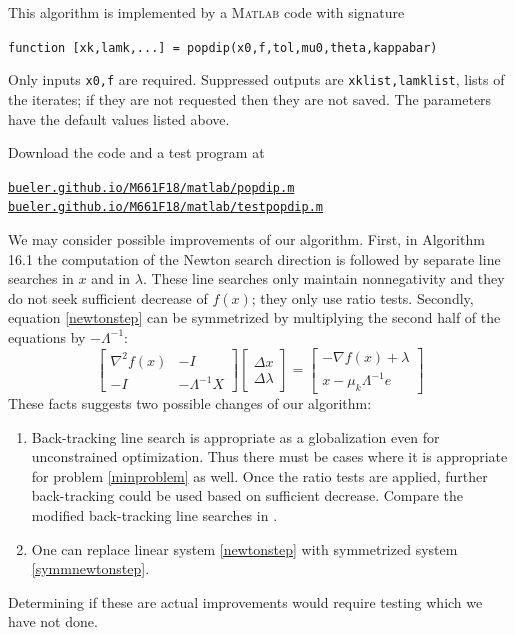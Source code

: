 \documentclass[11pt]{article}
\newcommand{\grad}{\nabla}
\newcommand{\Matlab}{\textsc{Matlab}\xspace}
\begin{document}
This algorithm is implemented by a \Matlab code with signature
\begin{center}
\texttt{function [xk,lamk,...] = popdip(x0,f,tol,mu0,theta,kappabar)}
\end{center}
Only inputs \texttt{x0,f} are required.  Suppressed outputs are \texttt{xklist,lamklist}, lists of the iterates; if they are not requested then they are not saved.  The parameters have the default values listed above.

Download the code and a test program at
\begin{center}
    \href{http://bueler.github.io/M661F18/matlab/popdip.m}{\texttt{bueler.github.io/M661F18/matlab/popdip.m}}
    \href{http://bueler.github.io/M661F18/matlab/testpopdip.m}{\texttt{bueler.github.io/M661F18/matlab/testpopdip.m}}
\end{center}

We may consider possible improvements of our algorithm.  First, in Algorithm 16.1 the computation of the Newton search direction is followed by separate line searches in $x$ and in $\lambda$.  These line searches only maintain nonnegativity and they do not seek sufficient decrease of $f(x)$; they only use ratio tests.  Secondly, equation \eqref{newtonstep} can be symmetrized by multiplying the second half of the equations by $-\Lambda^{-1}$:
\begin{equation}
\begin{bmatrix}
\grad^2 f(x) & - I \\
-I & - \Lambda^{-1} X
\end{bmatrix}
\begin{bmatrix}
\Delta x \\
\Delta \lambda
\end{bmatrix}
=
\begin{bmatrix}
-\grad f(x) + \lambda \\
x - \mu_k \Lambda^{-1} e
\end{bmatrix}
 \label{symmnewtonstep}
\end{equation}
These facts suggests two possible changes of our algorithm:
\begin{enumerate}
\item Back-tracking line search is appropriate as a globalization even for unconstrained optimization.  Thus there must be cases where it is appropriate for problem \eqref{minproblem} as well.  Once the ratio tests are applied, further back-tracking could be used based on sufficient decrease.  Compare the modified back-tracking line searches in \cite{BensonMunson2006}.
\item One can replace linear system \eqref{newtonstep} with symmetrized system \eqref{symmnewtonstep}.
\end{enumerate}
Determining if these are actual improvements would require testing which we have not done.
\end{document}
